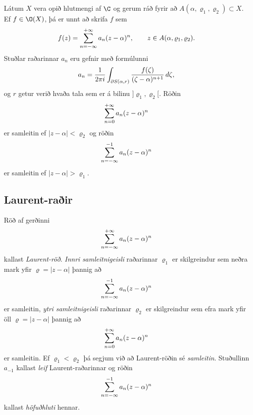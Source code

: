 \begin{se}
Látum $X$ vera opið hlutmengi af $\C$ og gerum ráð fyrir að
$A(\alpha,\varrho_1,\varrho_2)\subset X$.  Ef
$f\in \O(X)$, þá er unnt að skrifa $f$ sem
 \begin{equation*}f(z)=\sum_{n=-\infty}\sp{+\infty}a_n(z-\alpha)\sp n, \qquad z\in
A(\alpha,\varrho_1,\varrho_2).
\label{10.5.1}
 \end{equation*}
Stuðlar raðarinnar $a_n$ eru gefnir með formúlunni
 \begin{equation*}a_n=\dfrac 1{2\pi i}\int_{\partial S(\alpha,r)} \dfrac{f(\zeta)}
{(\zeta-\alpha)\sp{n+1}} \, d\zeta,
\label{10.5.2}
 \end{equation*}
og $r$ getur verið hvaða tala sem er á bilinu
$]\varrho_1,\varrho_2[$.  Röðin
$$\sum_{n=0}\sp{+\infty}a_n(z-\alpha)\sp n$$ 
er samleitin ef
$|z-\alpha|<\varrho_2$ og  röðin
$$\sum_{n=-\infty}\sp{-1}a_n(z-\alpha)\sp n$$ 
er samleitin ef
$|z-\alpha|>\varrho_1$.

\end{se}

\subsection*{Laurent-raðir}

\begin{sk}
Röð af gerðinni 
 $$\sum_{n=-\infty}\sp{+\infty}a_n(z-\alpha)\sp n
 $$
kallast {\it Laurent-röð}.  {\it Innri samleitnigeisli
}
raðarinnar $\varrho_1$ er skilgreindur sem neðra mark yfir
$\varrho=|z-\alpha|$ þannig að
$$ \sum_{n=-\infty}\sp{-1} a_n(z-{\alpha})\sp n $$
er samleitin, {\it ytri samleitnigeisli} raðarinnar
$\varrho_2$ er skilgreindur sem efra mark yfir öll $\varrho=|z-\alpha|$
þannig að
$$ \sum_{n=0}\sp{+\infty}a_n(z-{\alpha})\sp n $$
er samleitin. 
Ef $\varrho_1<\varrho_2$ þá segjum við að Laurent-röðin
sé {\it samleitin}.    Stuðullinn $a_{-1}$ kallast {\it
leif}
Laurent-raðarinnar 
og röðin 
$$\sum_{n=-\infty}\sp{-1}a_n(z-{\alpha})\sp n
$$ 
kallast {\it
höfuðhluti}
hennar.
\end{sk}


